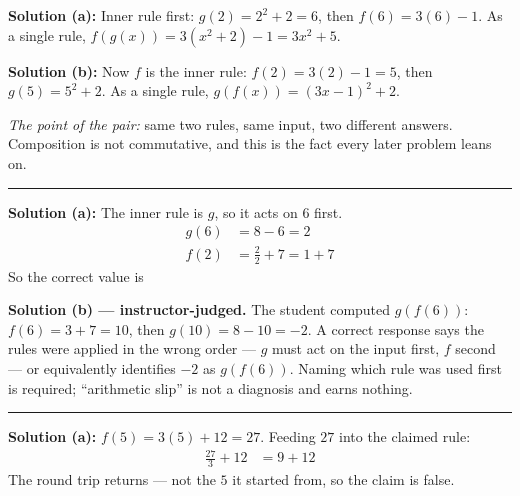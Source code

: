 \documentclass[12pt]{article}
\begin{document}




\textbf{Solution (a):} Inner rule first: $g(2) = 2^2 + 2 = 6$, then $f(6) = 3(6) - 1$. As a
single rule, $f(g(x)) = 3(x^2 + 2) - 1 = 3x^2 + 5$. 

\textbf{Solution (b):} Now $f$ is the inner rule: $f(2) = 3(2) - 1 = 5$, then
$g(5) = 5^2 + 2$. As a single rule, $g(f(x)) = (3x - 1)^2 + 2$. 

\vspace{0.1cm}
\noindent\emph{The point of the pair:} same two rules, same input, two different answers.
Composition is not commutative, and this is the fact every later problem leans on.

\vspace{0.2cm}\noindent\rule{\linewidth}{0.2pt}


\textbf{Solution (a):} The inner rule is $g$, so it acts on $6$ first.
\begin{align*}
  g(6) &= 8 - 6 = 2 \\
  f(2) &= \frac{2}{2} + 7 = 1 + 7
\end{align*}
So the correct value is 

\vspace{0.15cm}
\textbf{Solution (b) --- instructor-judged.} The student computed $g(f(6))$:
$f(6) = 3 + 7 = 10$, then $g(10) = 8 - 10 = -2$. A correct response says the rules were
applied in the wrong order --- $g$ must act on the input first, $f$ second --- or
equivalently identifies $-2$ as $g(f(6))$. Naming which rule was used first is required;
``arithmetic slip'' is not a diagnosis and earns nothing.

\vspace{0.2cm}\noindent\rule{\linewidth}{0.2pt}


\textbf{Solution (a):} $f(5) = 3(5) + 12 = 27$. Feeding $27$ into the claimed rule:
\begin{align*}
  \frac{27}{3} + 12 &= 9 + 12
\end{align*}
The round trip returns  --- not the $5$ it started from, so the claim is false.
\end{document}
